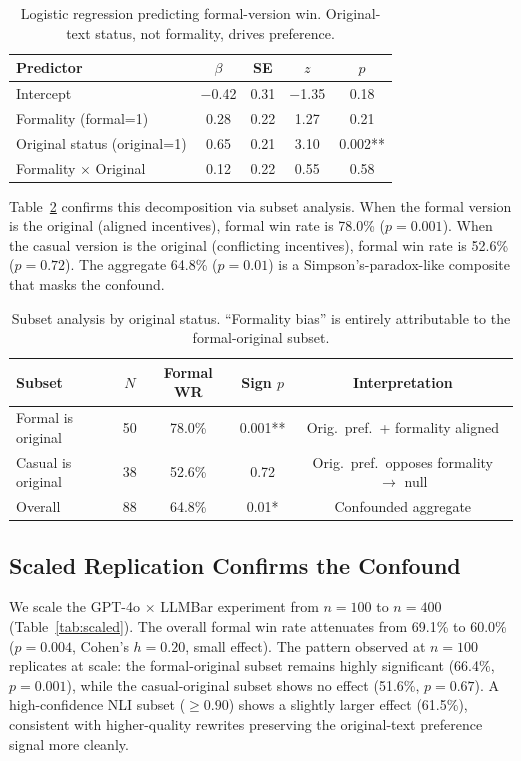 \documentclass[11pt,a4paper]{article}
\begin{document}
\begin{table}[t]
\centering
\small
\caption{Logistic regression predicting formal-version win. Original-text status, not formality, drives preference.}
\label{tab:logistic}
\begin{tabular}{lcccc}
\toprule
\textbf{Predictor} & \textbf{$\beta$} & \textbf{SE} & \textbf{$z$} & \textbf{$p$} \\
\midrule
Intercept & $-$0.42 & 0.31 & $-$1.35 & 0.18 \\
Formality (formal=1) & 0.28 & 0.22 & 1.27 & 0.21 \\
Original status (original=1) & 0.65 & 0.21 & 3.10 & 0.002** \\
Formality $\times$ Original & 0.12 & 0.22 & 0.55 & 0.58 \\
\bottomrule
\end{tabular}
\end{table}

Table~\ref{tab:subset} confirms this decomposition via subset analysis. When the formal version is the original (aligned incentives), formal win rate is 78.0\% ($p = 0.001$). When the casual version is the original (conflicting incentives), formal win rate is 52.6\% ($p = 0.72$). The aggregate 64.8\% ($p = 0.01$) is a Simpson's-paradox-like composite that masks the confound.

\begin{table}[t]
\centering
\small
\caption{Subset analysis by original status. ``Formality bias'' is entirely attributable to the formal-original subset.}
\label{tab:subset}
\begin{tabular}{lcccc}
\toprule
\textbf{Subset} & \textbf{$N$} & \textbf{Formal WR} & \textbf{Sign $p$} & \textbf{Interpretation} \\
\midrule
Formal is original & 50 & 78.0\% & 0.001** & Orig.\ pref.\ + formality aligned \\
Casual is original & 38 & 52.6\% & 0.72 & Orig.\ pref.\ opposes formality $\to$ null \\
Overall & 88 & 64.8\% & 0.01* & Confounded aggregate \\
\bottomrule
\end{tabular}
\end{table}

\subsection{Scaled Replication Confirms the Confound}
\label{sec:scaled}

We scale the GPT-4o $\times$ LLMBar experiment from $n=100$ to $n=400$ (Table~\ref{tab:scaled}). The overall formal win rate attenuates from 69.1\% to 60.0\% ($p=0.004$, Cohen's $h=0.20$, small effect). The pattern observed at $n=100$ replicates at scale: the formal-original subset remains highly significant (66.4\%, $p=0.001$), while the casual-original subset shows no effect (51.6\%, $p=0.67$). A high-confidence NLI subset ($\geq 0.90$) shows a slightly larger effect (61.5\%), consistent with higher-quality rewrites preserving the original-text preference signal more cleanly.
\end{document}
